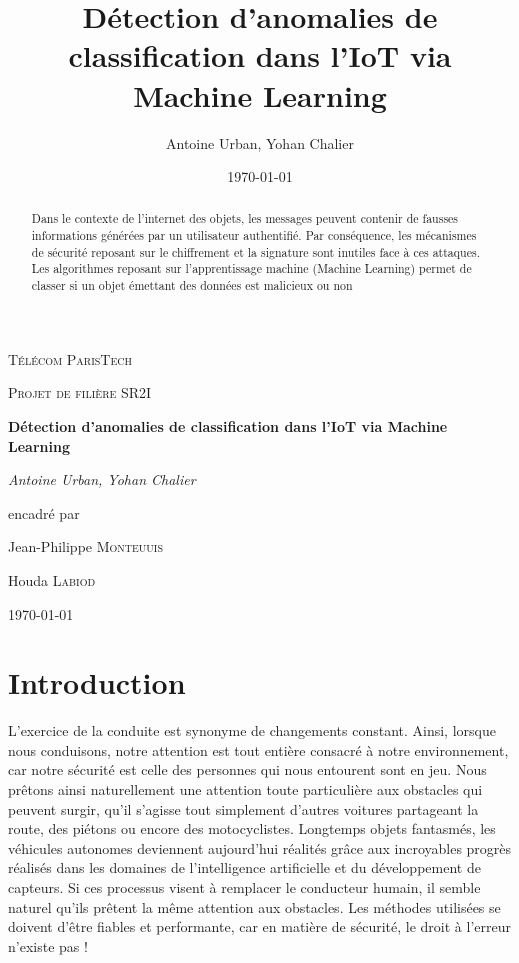 \documentclass[a4paper]{report}
\title{Détection d'anomalies de classification dans l'IoT via Machine Learning}
\author{Antoine Urban, Yohan Chalier}
\date{\today}
\begin{document}
\begin{titlepage}
	\centering
	\vspace{1cm}
	{\scshape\LARGE Télécom ParisTech \par}
	\vspace{1cm}
	{\scshape\Large Projet de filière SR2I \par}
	\vspace{1.5cm}
	{\huge\bfseries Détection d'anomalies de classification dans l'IoT via Machine Learning\par}
	\vspace{2cm}
	{\Large\itshape Antoine Urban, Yohan Chalier \par}
	\vfill
	encadré par\par
	Jean-Philippe \textsc{Monteuuis}\par
	Houda \textsc{Labiod}
	\vfill

	{\large \today\par}
\end{titlepage}



\begin{abstract}
Dans le contexte de l’internet des objets, les messages peuvent contenir de fausses informations générées par un utilisateur authentifié. Par conséquence, les mécanismes de sécurité reposant sur le chiffrement et la signature sont inutiles face à ces attaques. Les algorithmes reposant sur l’apprentissage machine (Machine Learning) permet de classer si un objet  émettant des données est malicieux ou non 
\end{abstract}

\section{Introduction}
L’exercice de la conduite est synonyme de changements constant. Ainsi, lorsque nous conduisons, notre attention est tout entière consacré à notre environnement, car notre sécurité est celle des personnes qui nous entourent sont en jeu. Nous prêtons ainsi naturellement une attention toute particulière aux obstacles qui peuvent surgir, qu’il s’agisse tout simplement d’autres voitures partageant la route, des piétons ou encore des motocyclistes. 
Longtemps objets fantasmés, les véhicules autonomes deviennent aujourd’hui réalités grâce aux incroyables progrès réalisés dans les domaines de l’intelligence artificielle et du développement de capteurs. Si ces processus visent à remplacer le conducteur humain, il semble naturel qu’ils prêtent la même attention aux obstacles. Les méthodes utilisées se doivent d’être fiables et performante, car en matière de sécurité, le droit à l’erreur n’existe pas ! \\
\end{document}
